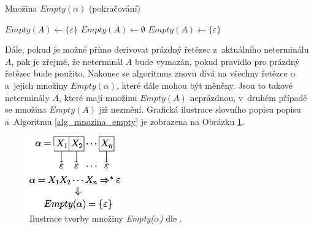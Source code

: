 \begin{algorithm}[ht]
    \begin{algorithmic}[1]
        \caption{Množina $Empty(\alpha)$ (pokračování)}
                \State $Empty(A) \gets \{\varepsilon\}$
            \Else
                \State $Empty(A) \gets \emptyset$
            \EndIf
        \EndFor
                \State $Empty(A) \gets \{\varepsilon\}$
            \EndIf
        \EndWhile
    \end{algorithmic}
\end{algorithm}

Dále, pokud je možné přímo derivovat prázdný řetězec z~aktuálního neterminálu $A$, pak je zřejmé, že neterminál $A$ bude vymazán, pokud pravidlo pro prázdný řetězec bude použito.
Nakonec se algoritmus znovu dívá na všechny řetězce $\alpha$ a~jejich množiny $Empty(\alpha)$, které dále mohou být měněny.
Jsou to takové neterminály $A$, které mají množinu $Empty(A)$ neprázdnou, v~druhém případě se množina $Empty(A)$ již nezmění.
Grafická ilustrace slovního popisu popisu a~Algoritmu \ref{alg_mnozina_empty} je zobrazena na Obrázku \ref{fig_mnozina_empty}.

\begin{figure}[ht]
    \centering
    \includegraphics[width=0.35\textwidth]{obrazky-figures/empty.eps}
    \caption{Ilustrace tvorby množiny \emph{Empty($\alpha$)} dle \cite{meduna2017sa-shora-dolu}.}
    \label{fig_mnozina_empty}
\end{figure}

